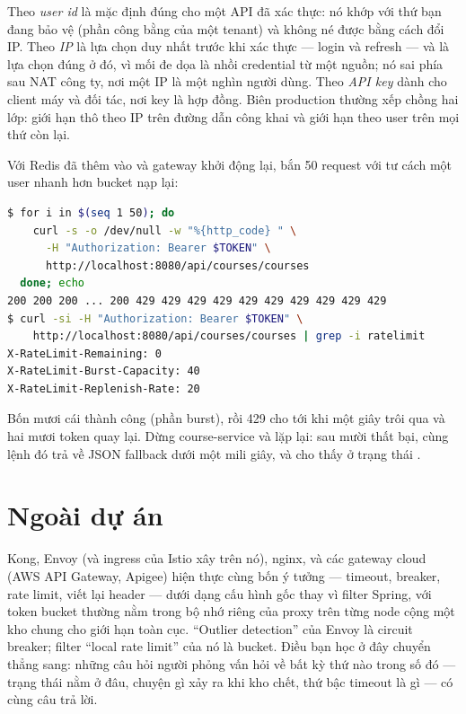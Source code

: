 \begin{decision}
Theo \emph{user id} là mặc định đúng cho một API đã xác thực: nó khớp
với thứ bạn đang bảo vệ (phần công bằng của một tenant) và không né
được bằng cách đổi IP. Theo \emph{IP} là lựa chọn duy nhất trước khi
xác thực --- login và refresh --- và là lựa chọn đúng ở đó, vì mối đe
dọa là nhồi credential từ một nguồn; nó sai phía sau NAT công ty, nơi
một IP là một nghìn người dùng. Theo \emph{API key} dành cho client máy
và đối tác, nơi key là hợp đồng. Biên production thường xếp chồng hai
lớp: giới hạn thô theo IP trên đường dẫn công khai và giới hạn theo
user trên mọi thứ còn lại.
\end{decision}

\begin{handson}
Với Redis đã thêm vào  và gateway khởi động
lại, bắn 50 request với tư cách một user nhanh hơn bucket nạp lại:
\begin{lstlisting}[language=bash]
$ for i in $(seq 1 50); do
    curl -s -o /dev/null -w "%{http_code} " \
      -H "Authorization: Bearer $TOKEN" \
      http://localhost:8080/api/courses/courses
  done; echo
200 200 200 ... 200 429 429 429 429 429 429 429 429 429 429
$ curl -si -H "Authorization: Bearer $TOKEN" \
    http://localhost:8080/api/courses/courses | grep -i ratelimit
X-RateLimit-Remaining: 0
X-RateLimit-Burst-Capacity: 40
X-RateLimit-Replenish-Rate: 20
\end{lstlisting}
Bốn mươi cái thành công (phần burst), rồi 429 cho tới khi một giây
trôi qua và hai mươi token quay lại. Dừng course-service và lặp lại:
sau mười thất bại, cùng lệnh đó trả về JSON fallback dưới một mili
giây, và \code{/actuator/circuitbreakers} cho thấy \code{courseCb} ở
trạng thái \code{OPEN}.
\end{handson}

\section{Ngoài dự án}

Kong, Envoy (và ingress của Istio xây trên nó), nginx, và các gateway
cloud (AWS API Gateway, Apigee) hiện thực cùng bốn ý tưởng --- timeout,
breaker, rate limit, viết lại header --- dưới dạng cấu hình gốc thay vì
filter Spring, với token bucket thường nằm trong bộ nhớ riêng của proxy
trên từng node cộng một kho chung cho giới hạn toàn cục. ``Outlier
detection'' của Envoy là circuit breaker; filter ``local rate limit''
của nó là bucket. Điều bạn học ở đây chuyển thẳng sang: những câu hỏi
người phỏng vấn hỏi về bất kỳ thứ nào trong số đó --- trạng thái nằm ở
đâu, chuyện gì xảy ra khi kho chết, thứ bậc timeout là gì --- có cùng
câu trả lời.

